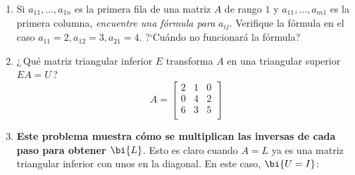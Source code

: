 \begin{enumerate}
\vspace{-7pt}
$$
A=\left[\begin{array}{rr}2&1\\6&7\\\end{array}\right]\qquad A=\left[\begin{array}{rrr}1&1&1\\1&1&1\\1&1&1\\\end{array}\right]\qquad A=\left[\begin{array}{rrr}2&-1&0\\-1&2&-1\\0&-1&2\\\end{array}\right]
$$
\item Si $a_{11},\ldots,a_{1n}$ es la primera fila de una matriz $A$ de rango $1$ y $a_{11},\ldots,a_{m1}$ es la primera columna, \emph{encuentre una fórmula para} $a_{ij}$. Verifique la fórmula en el caso $a_{11}=2, a_{12}=3, a_{21}=4$. ?`Cuándo no funcionará la fórmula?
\item ¿\,Qué matriz triangular inferior $E$ transforma $A$ en una triangular superior $EA=U$\,?
%
$$
A=\left[\begin{array}{rrr}2&1&0\\0&4&2\\6&3&5\\\end{array}\right]
$$

\item \textbf{Este problema muestra cómo se multiplican las inversas de cada paso para obtener $\bi{L}$}. Esto es claro cuando $A=L$ ya es una matriz triangular inferior con unos en la diagonal.
En este caso,  $\bi{U=I}$: 


\end{enumerate}
